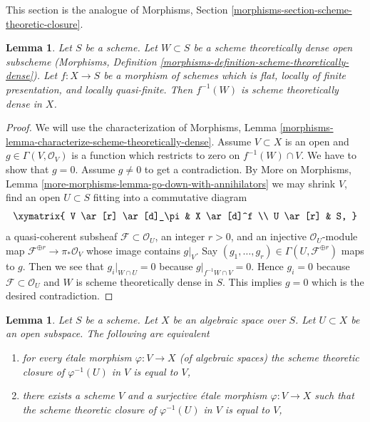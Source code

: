 \documentclass{stacks-project}
\theoremstyle{plain}
\newtheorem{lemma}[subsection]{Lemma}
\theoremstyle{definition}
\theoremstyle{remark}
\numberwithin{equation}{subsection}
\begin{document}
\noindent
This section is the analogue of
Morphisms, Section \ref{morphisms-section-scheme-theoretic-closure}.

\begin{lemma}
\label{lemma-scheme-theoretically-dense-representable}
Let $S$ be a scheme. Let $W \subset S$ be a scheme theoretically
dense open subscheme
(Morphisms, Definition \ref{morphisms-definition-scheme-theoretically-dense}).
Let $f : X \to S$ be a morphism of schemes which is flat, locally of
finite presentation, and locally quasi-finite.
Then $f^{-1}(W)$ is scheme theoretically dense in $X$.
\end{lemma}

\begin{proof}
We will use the characterization of Morphisms, Lemma
\ref{morphisms-lemma-characterize-scheme-theoretically-dense}.
Assume $V \subset X$ is an open and $g \in \Gamma(V, \mathcal{O}_V)$
is a function which restricts to zero on $f^{-1}(W) \cap V$.
We have to show that $g = 0$. Assume $g \not = 0$ to get a
contradiction. By
More on Morphisms, Lemma \ref{more-morphisms-lemma-go-down-with-annihilators}
we may shrink $V$, find an open $U \subset S$ fitting into a
commutative diagram
$$
\xymatrix{
V \ar[r] \ar[d]_\pi & X \ar[d]^f \\
U \ar[r] & S,
}
$$
a quasi-coherent subsheaf $\mathcal{F} \subset \mathcal{O}_U$, an integer
$r > 0$, and an injective $\mathcal{O}_U$-module map
$\mathcal{F}^{\oplus r} \to \pi_*\mathcal{O}_V$
whose image contains $g|_V$. Say
$(g_1, \ldots, g_r) \in \Gamma(U, \mathcal{F}^{\oplus r})$ maps to $g$.
Then we see that $g_i|_{W \cap U} = 0$ because $g|_{f^{-1}W \cap V} = 0$.
Hence $g_i = 0$ because $\mathcal{F} \subset \mathcal{O}_U$ and
$W$ is scheme theoretically dense in $S$.
This implies $g = 0$ which is the desired contradiction.
\end{proof}

\begin{lemma}
\label{lemma-scheme-theoretically-dense}
Let $S$ be a scheme.
Let $X$ be an algebraic space over $S$.
Let $U \subset X$ be an open subspace.
The following are equivalent
\begin{enumerate}
\item for every \'etale morphism $\varphi : V \to X$ (of algebraic spaces)
the scheme theoretic closure of $\varphi^{-1}(U)$ in $V$ is equal to $V$,
\item there exists a scheme $V$ and a surjective \'etale morphism
$\varphi : V \to X$ such that the scheme theoretic closure of
$\varphi^{-1}(U)$ in $V$ is equal to $V$,
\end{enumerate}
\end{lemma}
\end{document}

